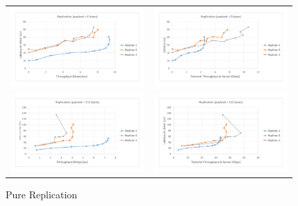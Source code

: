\documentclass[letterpaper,twocolumn,10pt]{article}
\begin{document}
\begin{figure}
\begin{tabular}{cc}
\begin{minipage}{0.25\textwidth}
  \includegraphics[width=\textwidth,height=3cm]{results/replication_mops_0.pdf}
\end{minipage}&
\begin{minipage}{0.25\textwidth}
  \hspace{-0.2in}
  \includegraphics[width=\textwidth,height=3cm]{results/replication_gbps_0.pdf}
\end{minipage}\\
\begin{minipage}{0.25\textwidth}
  \includegraphics[width=\textwidth,height=3cm]{results/replication_mops_512.pdf}
\end{minipage}&
\begin{minipage}{0.25\textwidth}
  \hspace{-0.2in}
  \includegraphics[width=\textwidth,height=3cm]{results/replication_gbps_512.pdf}
\end{minipage}
\end{tabular}
\caption{Pure Replication}
\label{fig:pure_rep}
\end{figure}
\end{document}
